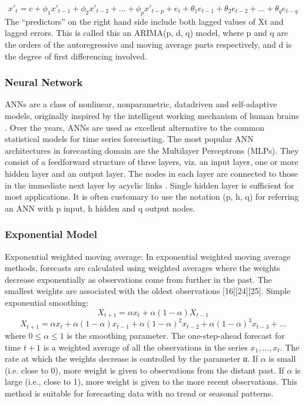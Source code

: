 	$${x}'_t = c + \phi_1{x}'_{ t-1} + \phi_2{x}'_{t-2} +...+ \phi_p{x}'_{t-p} + e_{t} + \theta_1e_{ t-1} + \theta_2e_{t-2} +...+ \theta_qe_{t-q}$$
The “predictors” on the right hand side include both lagged values of Xt and lagged errors. This is called this an ARIMA(p, d, q) model, where p and q are the orders of the autoregressive and moving average parts respectively, and d is the degree of first differencing involved.


\subsubsection{Neural Network}
ANNs are a class of nonlinear, nonparametric, datadriven and self-adaptive models, originally inspired by the
intelligent working mechanism of human brains . Over the years, ANNs are used as excellent alternative to the common statistical models for time series forecasting. The most popular ANN architectures in forecasting domain are the Multilayer Perceptrons (MLPs). They consist of a feedforward structure of three layers, viz. an input layer, one or more hidden layer and an output layer. The nodes in each layer are connected to those in the immediate next layer by acyclic links . Single hidden layer is sufficient for most applications. It is often customary to use the notation (p, h, q) for referring an ANN with p input, h hidden and q output nodes.

\subsubsection{Exponential Model}
Exponential weighted moving average: In exponential weighted moving average methods, forecasts are calculated using weighted averages where the weights decrease exponentially as observations come from further in the past. The smallest weights are associated with the oldest observations [16][24][25].
Simple exponential smoothing:
	$$X_{t+1}=\alpha x_t +\alpha(1-\alpha)X_{t-1}$$
	$$X_{t+1}=\alpha x_t +\alpha(1-\alpha)x_{t-1}+\alpha(1-\alpha)^2x_{t-2}+\alpha(1-\alpha)^3x_{t-3}+...$$
where $0\leq \alpha \leq 1$ is the smoothing parameter. The one-step-ahead forecast for time $t+1$ is a weighted average of all the observations in the series $x_1, …, x_t$. The rate at which the weights decrease is controlled by the parameter α. If $\alpha$ is small (i.e. close to 0), more weight is given to observations from the distant past. If $\alpha$ is large (i.e., close to 1), more weight is given to the more recent observations. This method is suitable for forecasting data with no trend or seasonal patterns.


